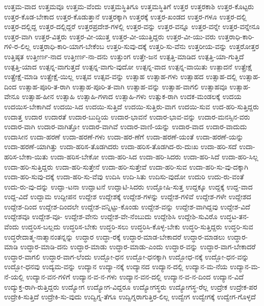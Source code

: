 {ಉತ್ತಮ-ವಾದ
ಉತ್ತಮವೂ
ಉತ್ತಮ-ವೆಂದು
ಉತ್ತಮಸ್ಥಿತಿಗೂ
ಉತ್ತಮಸ್ಥಿತಿಗೆ
ಉತ್ತರ
ಉತ್ತರಕಾಶಿ
ಉತ್ತರ-ಕೊಟ್ಟರು
ಉತ್ತರ-ಕೊಡ-ಬೇಕಾದ
ಉತ್ತರ-ಕೊಡುತ್ತಾನೆ
ಉತ್ತರಕ್ಕಾಗಿ
ಉತ್ತರಕ್ಕೆ
ಉತ್ತರ-ಖಂಡದ
ಉತ್ತರ-ಗಳೂ
ಉತ್ತರ-ದಲ್ಲಿ
ಉತ್ತರ-ದಲ್ಲಿದ್ದ
ಉತ್ತರ-ದಲ್ಲಿದ್ದರೆ
ಉತ್ತರಪ್ರದೇಶ-ಗಳಲ್ಲಿ
ಉತ್ತರ-ವನ್ನು
ಉತ್ತರ-ವನ್ನೂ
ಉತ್ತರ-ವನ್ನೇ
ಉತ್ತರ-ವನ್ನೇನೂ
ಉತ್ತರ-ವಾಗಿ
ಉತ್ತರ-ವಿತ್ತರು
ಉತ್ತರ-ವೀ-ಯುತ್ತ
ಉತ್ತರ-ವೀ-ಯುತ್ತಿದ್ದರು
ಉತ್ತರ-ವೀ-ಯು-ವರು
ಉತ್ತರಾಧಿ-ಕಾರಿ-ಗಳಿ-ರ-ಲಿಲ್ಲ
ಉತ್ತರಾಧಿ-ಕಾರಿ-ಯಾಗ-ಬೇಕೆಂಬ
ಉತ್ತರಿ-ಸುವು-ದಕ್ಕೆ
ಉತ್ತರಿ-ಸು-ವೆನು
ಉತ್ತರೀಯ-ವನ್ನು
ಉತ್ತರೋತ್ತರ
ಉತ್ತಿಷ್ಠತ
ಉತ್ತೀರ್ಣ-ನಾದ
ಉತ್ತೀರ್ಣ-ನಾ-ದನು
ಉತ್ತುಂಗ
ಉತ್ತೇ-ಜನ
ಉತ್ಪತ್ತಿ-ಮಾಡಿದ
ಉತ್ಪತ್ತಿ-ಯಾ-ಗುತ್ತಿದೆ
ಉತ್ಪತ್ತಿ-ಯಾದ
ಉತ್ಪನ್ನ-ವಾಗುತ್ತದೆ
ಉತ್ಪನ್ನ-ವಾಗು-ವುದೋ
ಉತ್ಪನ್ನ-ವಾದ
ಉತ್ಪನ್ನ-ವಾಯಿತು
ಉತ್ಪಾದನೆ
ಉತ್ಪ್ರೇಕ್ಷೆ
ಉತ್ಪ್ರೇಕ್ಷೆ-ಮಾಡಿ
ಉತ್ಪ್ರೇಕ್ಷೆ-ಯಿಲ್ಲ
ಉತ್ಸವ
ಉತ್ಸವ-ವನ್ನು
ಉತ್ಸಾಹ
ಉತ್ಸಾಹ-ಗಳು
ಉತ್ಸಾಹದ
ಉತ್ಸಾಹ-ದಲ್ಲಿ
ಉತ್ಸಾಹ-ದಿಂದ
ಉತ್ಸಾಹ-ಪೂರಿ-ತ-ರಾಗಿ
ಉತ್ಸಾಹ-ಪೂರಿ-ತ-ವಾಗಿ
ಉತ್ಸಾಹ-ವನ್ನು
ಉತ್ಸಾಹ-ವಾಗಲಿ
ಉತ್ಸಾಹವೂ
ಉತ್ಸಾಹ-ವೇನೂ
ಉತ್ಸಾಹ-ಹೀನ
ಉತ್ಸಾಹಿ
ಉತ್ಸಾಹಿ-ಗಳಾದ
ಉತ್ಸಾಹಿ-ಗಳು
ಉತ್ಸುಕ-ರಾಗಿ
ಉದಕ-ಮಂಡಲಕ್ಕೆ
ಉದಯ
ಉದಯಿಸ-ಬೇಕಾಗಿದೆ
ಉದಯಿ-ಸಿದ
ಉದಯಿ-ಸುತ್ತಿದೆ
ಉದಯಿ-ಸುತ್ತಿರು-ವಾಗ
ಉದಯಿ-ಸುವ
ಉದ-ಹರಿ-ಸುತ್ತಿದ್ದರು
ಉದಾತ್ತ
ಉದಾರ
ಉದಾರತೆ
ಉದಾರ-ಬುದ್ಧಿಯ
ಉದಾರ-ಭಾವನೆ
ಉದಾರ-ಭಾವ-ವನ್ನು
ಉದಾರ-ಮನಸ್ಸಿನ-ವರು
ಉದಾರ-ವಾಗಿ
ಉದಾರ-ವಾಗಿತ್ತೋ
ಉದಾರ-ವಾಗಿವೆ
ಉದಾರ-ವಾಣಿ-ಯನ್ನು
ಉದಾರ-ವಾದ
ಉದಾರ-ವಾದುದು
ಉದಾಸೀನ
ಉದಾ-ಹರಣೆ
ಉದಾ-ಹರಣೆ-ಗಳು
ಉದಾ-ಹರ-ಣೆಗೆ
ಉದಾ-ಹರಣೆ-ಯಂತೆ
ಉದಾ-ಹರಣೆ-ಯನ್ನು
ಉದಾ-ಹರಣೆ-ಯಾಗಿತ್ತು
ಉದಾ-ಹರಿಸ-ತೊಡಗಿದರು
ಉದಾ-ಹರಿಸ-ತೊಡಗಿದ-ರು-ದುಃಖ
ಉದಾ-ಹರಿ-ಸದೆ
ಉದಾ-ಹರಿಸ-ಬೇಕಾ-ಯಿತು
ಉದಾ-ಹರಿಸ-ಬೇಕೋ
ಉದಾ-ಹರಿ-ಸಿದ
ಉದಾ-ಹರಿ-ಸಿದರು
ಉದಾ-ಹರಿ-ಸಿದೆ
ಉದಾ-ಹರಿ-ಸಿಲ್ಲ
ಉದಾ-ಹರಿ-ಸುತ್ತಿದ್ದರು
ಉದಾ-ಹರಿ-ಸುತ್ತೇನೆ
ಉದಾ-ಹರಿ-ಸುತ್ತೇವೆ
ಉದಾ-ಹರಿ-ಸುವ
ಉದಾ-ಹರಿ-ಸು-ವು-ದಕ್ಕಾಗಿ
ಉದಾ-ಹರಿ-ಸುವು-ದಕ್ಕೆ
ಉದಾ-ಹರಿ-ಸು-ವೆವು
ಉದಿಸಿ
ಉದಿ-ಸಿತು
ಉದಿಸು-ವುದೋ
ಉದುರಿ
ಉದು-ರು-ವಂತೆ
ಉದು-ರು-ವು-ದನ್ನು
ಉದ್ಘಾ-ಟನಾ
ಉದ್ಘಾಟನೆ
ಉದ್ಘಾಟಿ-ಸಿದರು
ಉದ್ಘೋಷಿ-ಸುತ್ತ
ಉದ್ದಕ್ಕೂ
ಉದ್ದಕ್ಕೆ
ಉದ್ದ-ವಾದ
ಉದ್ದ-ವಿದೆ
ಉದ್ದಾಮ
ಉದ್ದೀಪನ
ಉದ್ದೇಶ
ಉದ್ದೇಶಕ್ಕೆ
ಉದ್ದೇಶ-ಗಳನ್ನು
ಉದ್ದೇಶ-ಗಳಿವೆ
ಉದ್ದೇಶ-ಗಳೇ
ಉದ್ದೇಶದ
ಉದ್ದೇಶ-ದಿಂದ
ಉದ್ದೇಶ-ದಿಂದಲೇ
ಉದ್ದೇಶ-ವನ್ನಿಟ್ಟು-ಕೊಂಡು
ಉದ್ದೇಶ-ವನ್ನು
ಉದ್ದೇಶ-ವಾಗಿದ್ದವು
ಉದ್ದೇಶ-ವಿದೆ
ಉದ್ದೇಶವೂ
ಉದ್ದೇಶ-ವೂ-
ಉದ್ದೇಶ-ವೇನು
ಉದ್ದೇಶ-ವೇ-ನೆಂಬುದು
ಉದ್ದೇಶಿಸಿ
ಉದ್ದೇಶಿ-ಸುವಿರೊ
ಉದ್ಧಟ-ತನ-ವೆಂದು
ಉದ್ಧರಿಸ-ಬಲ್ಲದು
ಉದ್ಧರಿಸ-ಬೇಕು
ಉದ್ಧರಿ-ಸಲು
ಉದ್ಧರಿಸಿ-ಕೊಳ್ಳ-ಬೇಕು
ಉದ್ಧರಿ-ಸುತ್ತಿದ್ದರು
ಉದ್ಧರಿ-ಸುವ
ಉದ್ಧರೇದಾತ್ಮ-ನಾತ್ಮಾನಂತನ್ನನ್ನು
ಉದ್ಧಾರ
ಉದ್ಧಾ-ರಕ್ಕೆ
ಉದ್ಧಾರ-ಮಾಡ-ಬೇಕಾದರೆ
ಉದ್ಧಾರ-ಮಾಡಲು
ಉದ್ಧಾರ-ಮಾಡಿ
ಉದ್ಧಾರ-ಮಾಡಿ-ದನು
ಉದ್ಧಾರ-ಮಾಡು
ಉದ್ಧಾರ-ಮಾಡು-ಎಂದು
ಉದ್ಧಾರ-ವನ್ನು
ಉದ್ಧಾರ-ವಾಗ-ಬೇಕಾದರೆ
ಉದ್ಧಾರ-ವಾಗಲಿ
ಉದ್ಧಾರ-ವಾಗ-ಲೆಂದು
ಉದ್ಬೋ-ಧನ
ಉದ್ಬೋ-ಧನಕ್ಕಾಗಿ
ಉದ್ಬೋಧ-ನಕ್ಕೆ
ಉದ್ಬೋ-ಧನ-ವನ್ನು
ಉದ್ಬೋ-ಧನವು
ಉದ್ಯಮ-ವನ್ನು
ಉದ್ಯಾನ
ಉದ್ಯಾ-ನಕ್ಕೆ
ಉದ್ಯಾನದ
ಉದ್ಯಾನ-ದಲ್ಲಿ
ಉದ್ಯಾನ-ಮ-ನೆಯ
ಉದ್ಯಾನ-ಮ-ನೆ-ಯಲ್ಲಿ
ಉದ್ಯಾನ-ವನ-ಗಳಿಗೆ
ಉದ್ಯಾನ-ವ-ನ-ಗಳು
ಉದ್ಯಾನ-ವನ-ದಲ್ಲಿ
ಉದ್ಯಾನ-ವ-ನ-ದಿಂದ
ಉದ್ಯಾನ-ವಿದೆ
ಉದ್ಯುಕ್ತ-ರಾಗಿ-ರುತ್ತಿದ್ದರು
ಉದ್ಯೋಗ
ಉದ್ಯೋಗ-ವಿದ್ದರೂ
ಉದ್ಯೋಗಸ್ಥರು
ಉದ್ಯೋಗಸ್ಥ-ರೆಲ್ಲ
ಉದ್ರೇಕ
ಉದ್ರೇಕ-ಪರ
ಉದ್ರೇಕಿ-ಸುತ್ತಿದೆ
ಉದ್ರೇಕಿ-ಸು-ವುದು
ಉದ್ವಿಗ್ನ-ತೆಗೂ
ಉದ್ವಿಗ್ನರಾಗುತ್ತಿರ-ಲಿಲ್ಲ
ಉದ್ವೇಗ
ಉದ್ವೇಗಕ್ಕೆ
ಉದ್ವೇಗ-ಗೊಳ್ಳದೆ
}
